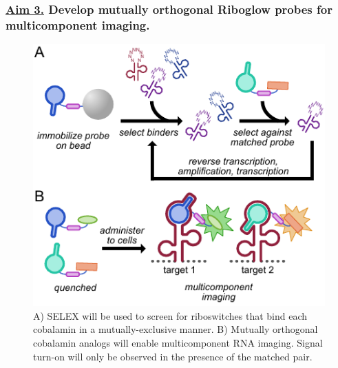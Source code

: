 \subsubsection*{\underline{Aim 3.} Develop mutually orthogonal Riboglow probes for multicomponent imaging.}
\begin{figure}
\begin{centering}
\includegraphics[width=\textwidth]{figures/aim3v2.pdf}
\end{centering}
\footnotesize
\caption{\label{figure:aim3}
A) SELEX will be used to screen for riboswitches that bind each cobalamin in a mutually-exclusive manner. B) Mutually orthogonal cobalamin analogs will enable multicomponent RNA imaging. Signal turn-on will only be observed in the presence of the matched pair.
}
\end{figure}



